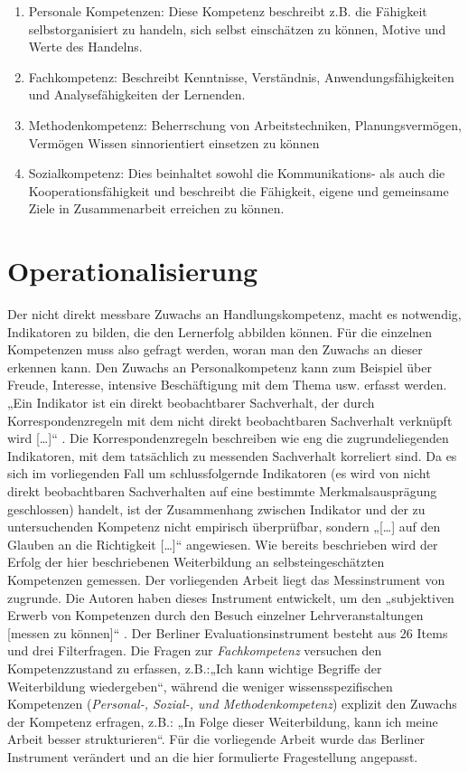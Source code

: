 \documentclass[12pt,smallheadings, bibliography=totoc]{scrartcl}
\begin{document}
\begin{enumerate}
\def\labelenumi{\arabic{enumi}.}
\item
  Personale Kompetenzen: Diese Kompetenz beschreibt z.B. die Fähigkeit
  selbstorganisiert zu handeln, sich selbst einschätzen zu können,
  Motive und Werte des Handelns.
\item
  Fachkompetenz: Beschreibt Kenntnisse, Verständnis,
  Anwendungsfähigkeiten und Analysefähigkeiten der Lernenden.
\item
  Methodenkompetenz: Beherrschung von Arbeitstechniken,
  Planungsvermögen, Vermögen Wissen sinnorientiert einsetzen zu können
\item
  Sozialkompetenz: Dies beinhaltet sowohl die Kommunikations- als auch
  die Kooperationsfähigkeit und beschreibt die Fähigkeit, eigene und
  gemeinsame Ziele in Zusammenarbeit erreichen zu können.
\end{enumerate}

\section{Operationalisierung}\label{operationalisierung}

Der nicht direkt messbare Zuwachs an Handlungskompetenz, macht es
notwendig, Indikatoren zu bilden, die den Lernerfolg abbilden können.
Für die einzelnen Kompetenzen muss also gefragt werden, woran man den
Zuwachs an dieser erkennen kann. Den Zuwachs an Personalkompetenz kann
zum Beispiel über Freude, Interesse, intensive Beschäftigung mit dem
Thema usw. erfasst werden. „Ein Indikator ist ein direkt beobachtbarer
Sachverhalt, der durch Korrespondenzregeln mit dem nicht direkt
beobachtbaren Sachverhalt verknüpft wird {[}\ldots{]}``
\parencite[85]{Kromrey2009}. Die Korrespondenzregeln beschreiben wie eng
die zugrundeliegenden Indikatoren, mit dem tatsächlich zu messenden
Sachverhalt korreliert sind. Da es sich im vorliegenden Fall um
schlussfolgernde Indikatoren (es wird von nicht direkt beobachtbaren
Sachverhalten auf eine bestimmte Merkmalsausprägung geschlossen)
handelt, ist der Zusammenhang zwischen Indikator und der zu
untersuchenden Kompetenz nicht empirisch überprüfbar, sondern
„{[}\ldots{]} auf den Glauben an die Richtigkeit {[}\ldots{]}``
\parencite[166]{Kromrey2009} angewiesen. Wie bereits beschrieben wird
der Erfolg der hier beschriebenen Weiterbildung an selbsteingeschätzten
Kompetenzen gemessen. Der vorliegenden Arbeit liegt das Messinstrument
von \textcite{Braun2008} zugrunde. Die Autoren haben dieses Instrument
entwickelt, um den „subjektiven Erwerb von Kompetenzen durch den Besuch
einzelner Lehrveranstaltungen {[}messen zu können{]}``
\parencite[30]{Braun2008}. Der Berliner Evaluationsinstrument besteht
aus 26 Items und drei Filterfragen. Die Fragen zur \emph{Fachkompetenz}
versuchen den Kompetenzzustand zu erfassen, z.B.:„Ich kann wichtige
Begriffe der Weiterbildung wiedergeben``, während die weniger
wissensspezifischen Kompetenzen (\emph{Personal-, Sozial-, und
Methodenkompetenz}) explizit den Zuwachs der Kompetenz erfragen, z.B.:
„In Folge dieser Weiterbildung, kann ich meine Arbeit besser
strukturieren``. Für die vorliegende Arbeit wurde das Berliner
Instrument verändert und an die hier formulierte Fragestellung
angepasst.
\end{document}
